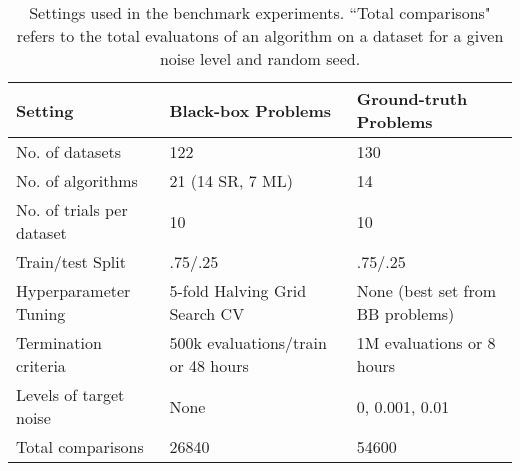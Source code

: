 \begin{table}
    \footnotesize
    \center
    \caption{
        Settings used in the benchmark experiments. 
        ``Total comparisons" refers to the total evaluatons of an algorithm on a dataset for a given noise level and random seed.
    }\label{tbl:exp}
    \begin{tabular}{lll}
        Setting                     &   Black-box Problems              &   Ground-truth Problems                   \\
        \midrule
        No. of datasets             &   122                             &   130                                     \\
        No. of algorithms           &   21 (14 SR, 7 ML)                &   14                                      \\
        No. of trials per dataset   &   10                              &   10                                      \\
        Train/test Split            &   .75/.25                         &   .75/.25                                 \\
        Hyperparameter Tuning       &   5-fold Halving Grid Search CV   &   None (best set from BB problems)        \\
        Termination criteria        &   500k evaluations/train or 48 hours    &   1M evaluations or 8 hours         \\ 
        Levels of target noise      &   None                            &   0, 0.001, 0.01                          \\
        Total comparisons           &   26840                           &   54600                                   \\ 
        \bottomrule
    \end{tabular}
\end{table}
